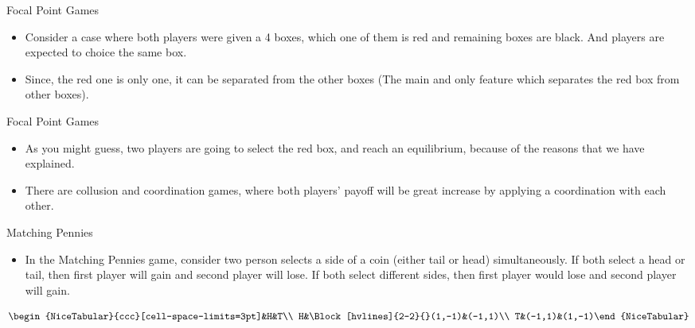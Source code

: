 \documentclass[
  ignorenonframetext,
]{beamer}
\begin{document}
\begin{frame}{Focal Point Games}
\protect\hypertarget{focal-point-games-2}{}
\begin{itemize}
  \item Consider a case where both players were given a 4 boxes, which one of them is red and remaining boxes are black. And players are expected to choice the same box.
\end{itemize}

\begin{center}
  \fboxsep=6mm \fboxrule=1mm
    \fboxsep=6mm \fboxrule=1mm
\end{center}
\begin{center}
  \fboxsep=6mm \fboxrule=1mm
    \fboxsep=6mm \fboxrule=1mm
\end{center}

\begin{itemize}
  \item Since, the red one is only one, it can be separated from the other boxes (The main and only feature which separates the red box from other boxes).
\end{itemize}
\end{frame}

\begin{frame}{Focal Point Games}
\protect\hypertarget{focal-point-games-3}{}
\begin{itemize}
  \item As you might guess, two players are going to select the red box, and reach an equilibrium, because of the reasons that we have explained.
  \item There are collusion and coordination games, where both players' payoff will be great increase by applying a coordination with each other.
\end{itemize}
\end{frame}

\begin{frame}{Matching Pennies}
\protect\hypertarget{matching-pennies}{}
\begin{itemize}
  \item In the Matching Pennies game, consider two person selects a side of a coin (either tail or head) simultaneously. If both select a head or tail, then first player will gain and second player will lose. If both select different sides, then first player would lose and second player will gain.
\end{itemize}

\[\begin{NiceTabular}{ccc}[cell-space-limits=3pt]&H&T\\
H&\Block[hvlines]{2-2}{}(1,-1)&(-1,1)\\
T&(-1,1)&(1,-1)\end{NiceTabular}\]
\end{frame}
\end{document}
